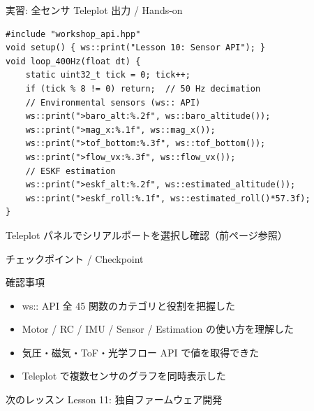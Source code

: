 \begin{frame}[fragile]{実習: 全センサ Teleplot 出力 / Hands-on}
  \begin{lstlisting}[style=sfcpp, basicstyle=\ttfamily\scriptsize]
#include "workshop_api.hpp"
void setup() { ws::print("Lesson 10: Sensor API"); }
void loop_400Hz(float dt) {
    static uint32_t tick = 0; tick++;
    if (tick % 8 != 0) return;  // 50 Hz decimation
    // Environmental sensors (ws:: API)
    ws::print(">baro_alt:%.2f", ws::baro_altitude());
    ws::print(">mag_x:%.1f", ws::mag_x());
    ws::print(">tof_bottom:%.3f", ws::tof_bottom());
    ws::print(">flow_vx:%.3f", ws::flow_vx());
    // ESKF estimation
    ws::print(">eskf_alt:%.2f", ws::estimated_altitude());
    ws::print(">eskf_roll:%.1f", ws::estimated_roll()*57.3f);
}
  \end{lstlisting}

  \vspace{0.2em}
  {\footnotesize
    Teleplot パネルでシリアルポートを選択し確認（前ページ参照）
  }
\end{frame}

\begin{frame}{チェックポイント / Checkpoint}
  \begin{alertblock}{確認事項}
    \begin{itemize}
      \item[$\square$] ws:: API 全 45 関数のカテゴリと役割を把握した
      \item[$\square$] Motor / RC / IMU / Sensor / Estimation の使い方を理解した
      \item[$\square$] 気圧・磁気・ToF・光学フロー API で値を取得できた
      \item[$\square$] Teleplot で複数センサのグラフを同時表示した
    \end{itemize}
  \end{alertblock}

  \vspace{0.5em}

  \begin{block}{次のレッスン}
    Lesson 11: 独自ファームウェア開発
  \end{block}
\end{frame}
